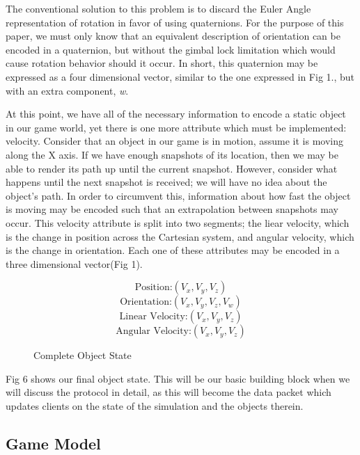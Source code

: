 \documentclass[conference]{IEEEtran}
\begin{document}
The conventional solution to this problem is to discard the Euler Angle representation of rotation in favor of using quaternions. 
For the purpose of this paper, we must only know that an equivalent description of orientation can be encoded in a quaternion,
but without the gimbal lock limitation which would cause rotation behavior should it occur. In short, this quaternion may be expressed as a four dimensional
vector, similar to the one expressed in Fig 1., but with an extra component, \textit{w}. 

At this point, we have all of the necessary information to encode a static object in our game world, yet there is one more attribute which
must be implemented: velocity. Consider that an object in our game is in motion, assume it is moving along the X axis. If we have enough snapshots of its location,
then we may be able to render its path up until the current snapshot. However, consider what happens until the next snapshot is received; we will have no idea about the object's path. 
In order to circumvent this, information about how fast the object is moving may be encoded such that an extrapolation between snapshots may occur. This velocity attribute 
is split into two segments; the liear velocity, which is the change in position across the Cartesian system, and angular velocity, which is the change in orientation. 
Each one of these attributes may be encoded in a three dimensional vector(Fig 1).

\begin{figure}[htbp]
\begin{equation}
\text {Position:} (V_{x}, V_{y}, V_{z})
\end{equation}
\begin{equation}
\text {Orientation:} (V_{x}, V_{y}, V_{z}, V_{w})
\end{equation}
\begin{equation}
\text {Linear Velocity:} (V_{x}, V_{y}, V_{z})
\end{equation}
\begin{equation}
\text {Angular Velocity:} (V_{x}, V_{y}, V_{z})
\end{equation}
\caption{Complete Object State}
\end{figure}

Fig 6 shows our final object state. This will be our basic building block when we will discuss the protocol in detail, 
as this will become the data packet which updates clients on the state of the simulation and the objects therein. 

\subsection{Game Model}
\end{document}
